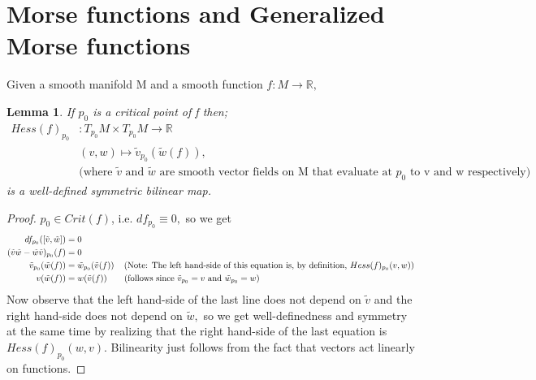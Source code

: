 \documentclass{article}
\newtheorem{lemma}[theorem]{Lemma}
\newtheorem{proposed work}[theorem]{Proposed Work}
\theoremstyle{definition}
\begin{document}

\section{Morse functions and Generalized Morse functions}

Given a smooth manifold M and a smooth function $f\colon M \to \mathbb{R},$

\begin{lemma}
If $p_0$ is a critical point of f then;
 \begin{align*} 
Hess(f)_{p_0}&\colon T_{p_0}M\times T_{p_0}M\to \mathbb{R} \\
&(v,w)\mapsto \tilde{v}_{p_0}(\tilde{w}(f)), \\
&\text{(where $\tilde{v}$ and $\tilde{w}$ are smooth vector fields on M that evaluate at $p_0$ to v and w respectively)}
\end{align*}
is a well-defined symmetric bilinear map.
\end{lemma}
\begin{proof}


 $p_0\in Crit(f)$, i.e. $df_{p_0}\equiv 0,$ so we get 
\begin{align*}
df_{p_0}([\tilde{v},\tilde{w}])&=0\\
(\tilde{v}\tilde{w}-\tilde{w}\tilde{v})_{p_0}(f)&=0\\
\tilde{v}_{p_0}(\tilde{w}(f))&=\tilde{w}_{p_0}(\tilde{v}(f))\hspace{4mm} \text{(Note: The left hand-side of this equation is, by definition, $Hess(f)_{p_0}(v,w)$)}\\
v(\tilde{w}(f))&=w(\tilde{v}(f)) \hspace{7mm} (\text{follows since $\tilde{v}_{p_0}=v$ and $\tilde{w}_{p_0}=w$})
\end{align*}
Now observe that the left hand-side of the last line does not depend on $\tilde{v}$ and the right hand-side does not depend on $\tilde{w},$ so we get well-definedness and symmetry at the same time by realizing that the right hand-side of the last equation is $Hess(f)_{p_0}(w,v).$ Bilinearity just follows from the fact that vectors act linearly on functions. 
\end{proof}
\end{document}

